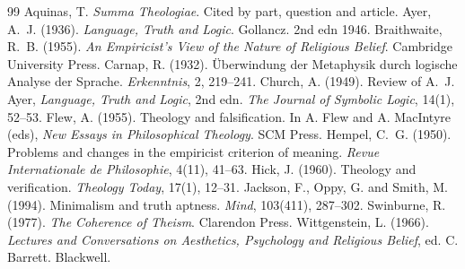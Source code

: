 \documentclass{situationist-preprint}
\begin{document}
\begin{thebibliography}{99}\small
{} Aquinas, T. \emph{Summa Theologiae}. Cited by part, question and article.
 Ayer, A.~J. (1936). \emph{Language, Truth and Logic}. Gollancz. 2nd edn 1946.
 Braithwaite, R.~B. (1955). \emph{An Empiricist's View of the Nature of Religious Belief}. Cambridge University Press.
 Carnap, R. (1932). \"Uberwindung der Metaphysik durch logische Analyse der Sprache. \emph{Erkenntnis}, 2, 219--241.
 Church, A. (1949). Review of A.~J. Ayer, \emph{Language, Truth and Logic}, 2nd edn. \emph{The Journal of Symbolic Logic}, 14(1), 52--53.
 Flew, A. (1955). Theology and falsification. In A. Flew and A. MacIntyre (eds), \emph{New Essays in Philosophical Theology}. SCM Press.
 Hempel, C.~G. (1950). Problems and changes in the empiricist criterion of meaning. \emph{Revue Internationale de Philosophie}, 4(11), 41--63.
 Hick, J. (1960). Theology and verification. \emph{Theology Today}, 17(1), 12--31.
 Jackson, F., Oppy, G. and Smith, M. (1994). Minimalism and truth aptness. \emph{Mind}, 103(411), 287--302.
 Swinburne, R. (1977). \emph{The Coherence of Theism}. Clarendon Press.
 Wittgenstein, L. (1966). \emph{Lectures and Conversations on Aesthetics, Psychology and Religious Belief}, ed. C. Barrett. Blackwell.
\end{thebibliography}
\end{document}
